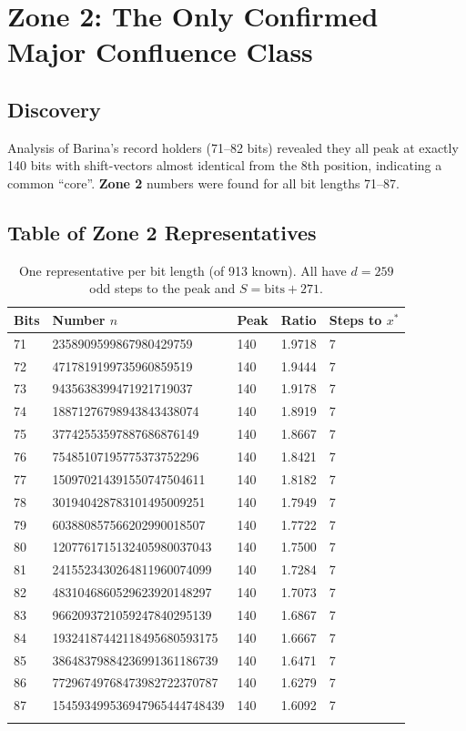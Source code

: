 \documentclass[12pt,a4paper]{article}
\theoremstyle{remark}
\begin{document}
\section{Zone 2: The Only Confirmed Major Confluence Class}
\subsection{Discovery}
Analysis of Barina's record holders (71--82 bits) revealed they all peak at exactly 140 bits with shift-vectors almost identical from the 8th position, indicating a common ``core''. \textbf{Zone 2} numbers were found for all bit lengths 71--87.

\subsection{Table of Zone 2 Representatives}
\begin{longtable}{lllll}
\toprule
\textbf{Bits} & \textbf{Number $n$} & \textbf{Peak} & \textbf{Ratio} & \textbf{Steps to $x^*$} \\
\midrule
71 & 2358909599867980429759 & 140 & 1.9718 & 7 \\
72 & 4717819199735960859519 & 140 & 1.9444 & 7 \\
73 & 9435638399471921719037 & 140 & 1.9178 & 7 \\
74 & 18871276798943843438074 & 140 & 1.8919 & 7 \\
75 & 37742553597887686876149 & 140 & 1.8667 & 7 \\
76 & 75485107195775373752296 & 140 & 1.8421 & 7 \\
77 & 150970214391550747504611 & 140 & 1.8182 & 7 \\
78 & 301940428783101495009251 & 140 & 1.7949 & 7 \\
79 & 603880857566202990018507 & 140 & 1.7722 & 7 \\
80 & 1207761715132405980037043 & 140 & 1.7500 & 7 \\
81 & 2415523430264811960074099 & 140 & 1.7284 & 7 \\
82 & 4831046860529623920148297 & 140 & 1.7073 & 7 \\
83 & 9662093721059247840295139 & 140 & 1.6867 & 7 \\
84 & 19324187442118495680593175 & 140 & 1.6667 & 7 \\
85 & 38648379884236991361186739 & 140 & 1.6471 & 7 \\
86 & 77296749768473982722370787 & 140 & 1.6279 & 7 \\
87 & 154593499536947965444748439 & 140 & 1.6092 & 7 \\
\bottomrule
\caption*{One representative per bit length (of 913 known). All have $d=259$ odd steps to the peak and $S = \mathrm{bits}+271$.}
\end{longtable}
\end{document}
